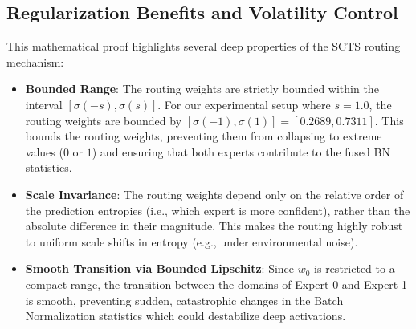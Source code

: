 \documentclass{article}
\theoremstyle{plain}
\theoremstyle{definition}
\theoremstyle{remark}
\begin{document}
\subsection{Regularization Benefits and Volatility Control}
This mathematical proof highlights several deep properties of the SCTS routing mechanism:
\begin{itemize}
    \item \textbf{Bounded Range}: The routing weights are strictly bounded within the interval $[\sigma(-s), \sigma(s)]$. For our experimental setup where $s = 1.0$, the routing weights are bounded by $[\sigma(-1), \sigma(1)] = [0.2689, 0.7311]$. This bounds the routing weights, preventing them from collapsing to extreme values ($0$ or $1$) and ensuring that both experts contribute to the fused BN statistics.
    \item \textbf{Scale Invariance}: The routing weights depend only on the relative order of the prediction entropies (i.e., which expert is more confident), rather than the absolute difference in their magnitude. This makes the routing highly robust to uniform scale shifts in entropy (e.g., under environmental noise).
    \item \textbf{Smooth Transition via Bounded Lipschitz}: Since $w_0$ is restricted to a compact range, the transition between the domains of Expert 0 and Expert 1 is smooth, preventing sudden, catastrophic changes in the Batch Normalization statistics which could destabilize deep activations.
\end{itemize}
\end{document}
